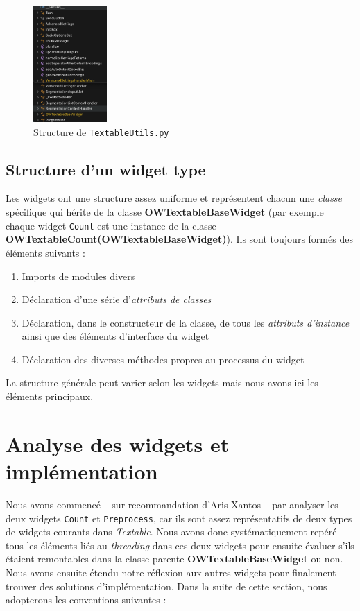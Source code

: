 \documentclass{article}
\begin{document}
\vspace{5mm}

\begin{figure}[htbp]
    \centering
    \includegraphics[width=0.25\textwidth]{structure_utils.png}
    \caption{Structure de \texttt{TextableUtils.py}}
    \label{fig:textable_utils}
\end{figure}

\subsection{Structure d'un widget type}

Les widgets ont une structure assez uniforme et représentent chacun une \textit{classe} spécifique qui hérite de la classe \textbf{OWTextableBaseWidget} (par exemple chaque widget \texttt{Count} est une instance de la classe \textbf{OWTextableCount(OWTextableBaseWidget)}). Ils sont toujours formés des éléments suivants : 

\begin{enumerate}
    \item Imports de modules divers
    \item Déclaration d'une série d'\textit{attributs de classes}
    \item Déclaration, dans le constructeur de la classe, de tous les \textit{attributs d'instance} ainsi que des éléments d'interface du widget
    \item Déclaration des diverses méthodes propres au processus du widget
\end{enumerate}

La structure générale peut varier selon les widgets mais nous avons ici les éléments principaux.

\section{Analyse des widgets et implémentation}

Nous avons commencé – sur recommandation d'Aris Xantos – par analyser les deux widgets \texttt{Count} et \texttt{Preprocess}, car ils sont assez représentatifs de deux types de widgets courants dans \textit{Textable}. Nous avons donc systématiquement repéré tous les éléments liés au \textit{threading} dans ces deux widgets pour ensuite évaluer s'ils étaient remontables dans la classe parente \textbf{OWTextableBaseWidget} ou non. Nous avons ensuite étendu notre réflexion aux autres widgets pour finalement trouver des solutions d'implémentation. Dans la suite de cette section, nous adopterons les conventions suivantes : 
\end{document}
